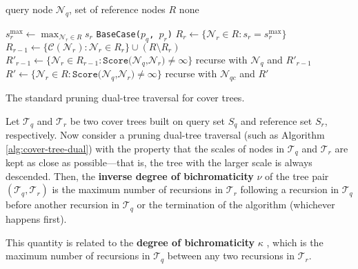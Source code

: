 \begin{algorithm}[htb]
  \begin{algorithmic}[1]
     query node $\mathscr{N}_q$, set of reference nodes
$R$ \label{alg:line:ct-dual-input}
     none

    \medskip
    \STATE $s^{\max}_r \gets \max_{\mathscr{N}_r \in R} s_r$
\label{alg:line:ct-dual-ref-recursion-start}
       \label{alg:line:ct-dual-base-case-start}
        \STATE \texttt{BaseCase($p_q$, $p_r$)}
      \ENDFOR \label{alg:line:ct-dual-base-case-end}
      \STATE $R_r \gets \{ \mathscr{N}_r \in R : s_r = s^{\max}_r \}$
\label{alg:line:ct-dual-ref-set}
      \STATE $R_{r - 1} \gets \{ \mathscr{C}(\mathscr{N}_r) : \mathscr{N}_r \in
R_r \} \cup (R \setminus R_r)$ \label{alg:line:ct-dual-ref-children}
      \STATE $R'_{r - 1} \gets \{ \mathscr{N}_r \in R_{r - 1} :
\texttt{Score(}\mathscr{N}_q\texttt{,} \mathscr{N}_r\texttt{)} \ne \infty \}$
\label{alg:line:ct-dual-ref-score}
      \STATE recurse with $\mathscr{N}_q$ and $R'_{r - 1}$
\label{alg:line:ct-dual-ref-recursion-end}
    \ELSE \label{alg:line:ct-dual-query-recursion-start}
        \STATE $R' \gets \{ \mathscr{N}_r \in R :
\texttt{Score(}\mathscr{N}_q\texttt{,} \mathscr{N}_r\texttt{)} \ne \infty \}$
\label{alg:line:ct-dual-query-pruning}
        \STATE recurse with $\mathscr{N}_{qc}$ and $R'$
\label{alg:line:ct-dual-query-recursion}
      \ENDFOR \label{alg:line:ct-dual-query-recursion-end}
    \ENDIF
  \end{algorithmic}
  \caption{The standard pruning dual-tree traversal for cover trees.}
  \label{alg:cover-tree-dual}
\end{algorithm}

\begin{defn}
\label{def:bichromaticity}
Let $\mathscr{T}_q$ and $\mathscr{T}_r$ be two cover trees built on query set
$S_q$ and reference set $S_r$, respectively.  Now consider a pruning dual-tree
traversal (such as Algorithm \ref{alg:cover-tree-dual}) with the property that
the scales of nodes in $\mathscr{T}_q$ and $\mathscr{T}_r$ are kept as close as
possible---that is, the tree with the larger scale is always descended.  Then,
the {\bf inverse degree of bichromaticity} $\nu$ of the tree pair
$(\mathscr{T}_q, \mathscr{T}_r)$ is the maximum number of recursions in
$\mathscr{T}_r$ following a recursion in $\mathscr{T}_q$ before another
recursion in $\mathscr{T}_q$ or the termination of the algorithm (whichever
happens first).

This quantity is related to the {\bf degree of bichromaticity} $\kappa$
\cite{ram2009}, which is the maximum number of recursions in $\mathscr{T}_q$
between any two recursions in $\mathscr{T}_r$.
\end{defn}

